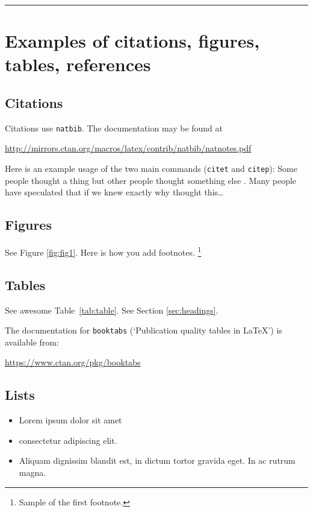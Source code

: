 \documentclass{article}
\begin{document}
\noindent\rule{16cm}{0.4pt}


\section{Examples of citations, figures, tables, references}
\label{sec:others}

\subsection{Citations}
Citations use \verb+natbib+. The documentation may be found at
\begin{center}
	\url{http://mirrors.ctan.org/macros/latex/contrib/natbib/natnotes.pdf}
\end{center}

Here is an example usage of the two main commands (\verb+citet+ and \verb+citep+): Some people thought a thing \citep{kour2014real, hadash2018estimate} but other people thought something else \citep{kour2014fast}. Many people have speculated that if we knew exactly why \citet{kour2014fast} thought this\dots

\subsection{Figures}
\lipsum[10]
See Figure \ref{fig:fig1}. Here is how you add footnotes. \footnote{Sample of the first footnote.}
\lipsum[11]



\subsection{Tables}
See awesome Table~\ref{tab:table}.
See Section \ref{sec:headings}.

The documentation for \verb+booktabs+ (`Publication quality tables in LaTeX') is available from:
\begin{center}
	\url{https://www.ctan.org/pkg/booktabs}
\end{center}




\subsection{Lists}
\begin{itemize}
	\item Lorem ipsum dolor sit amet
	\item consectetur adipiscing elit.
	\item Aliquam dignissim blandit est, in dictum tortor gravida eget. In ac rutrum magna.
\end{itemize}
\end{document}
